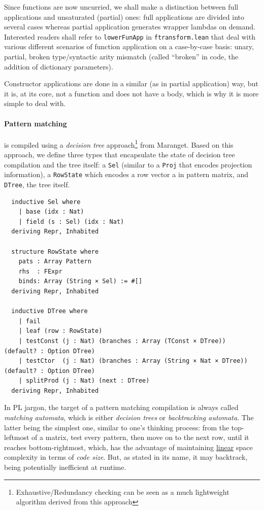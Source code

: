 \documentclass[a4paper, 11pt]{article}
\theoremstyle{remark}\newtheorem*{remark}{Remark}
\theoremstyle{definition}\newtheorem*{definition}{Definition}
\begin{document}
Since functions are now uncurried, we shall make a distinction between full applications
and unsaturated (partial) ones: full applications are divided into several cases
whereas partial application generates wrapper lambdas on demand.
Interested readers shall refer to \texttt{lowerFunApp} in \texttt{ftransform.lean}
that deal with various different scenarios
of function application on a case-by-case basis: unary, partial, broken type/syntactic arity mismatch (called ``broken'' in code, the addition of dictionary parameters).

Constructor applications are done in a similar (as in partial application) way, but it is, at its core,
not a function and does not have a body, which is why it is more simple to deal with.

\paragraph{Pattern matching} is compiled using a \emph{decision tree} approach\footnote{
Exhaustive/Redundancy checking can be seen as a much lightweight algorithm derived from this approach
}
from Maranget. Based on this approach, we define three types that
encapsulate the state of decision tree compilation and the tree itself:
a \texttt{Sel} (similar to a \texttt{Proj} that encodes projection information), a \texttt{RowState}
which encodes a row vector a in pattern matrix, and \texttt{DTree}, the tree itself.

\begin{verbatim}
  inductive Sel where
    | base (idx : Nat)
    | field (s : Sel) (idx : Nat)
  deriving Repr, Inhabited

  structure RowState where
    pats : Array Pattern
    rhs  : FExpr
    binds: Array (String × Sel) := #[]
  deriving Repr, Inhabited

  inductive DTree where
    | fail
    | leaf (row : RowState)
    | testConst (j : Nat) (branches : Array (TConst × DTree)) (default? : Option DTree)
    | testCtor  (j : Nat) (branches : Array (String × Nat × DTree)) (default? : Option DTree)
    | splitProd (j : Nat) (next : DTree)
  deriving Repr, Inhabited
\end{verbatim}

In PL jargon, the target of a pattern matching compilation is always called \emph{matching automata}, which is
either \emph{decision trees} or \emph{backtracking automata}. The latter being the simplest one,
similar to one's thinking process: from the top-leftmost of a matrix,
test every pattern, then move on to the next row, until it reaches bottom-rightmost, which, has the
advantage of maintaining \underline{linear} space complexity in terms of \emph{code size}. But, as stated
in its name, it may backtrack, being potentially inefficient at runtime.
\end{document}
